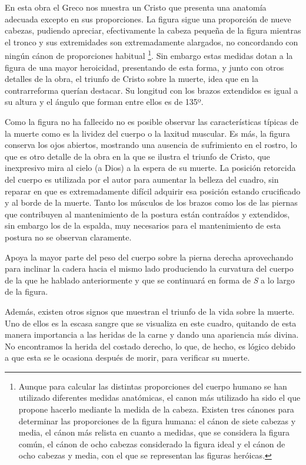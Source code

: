 En esta obra el Greco nos muestra un Cristo que presenta una anatomía adecuada excepto en sus proporciones. La figura sigue una proporción de nueve cabezas, pudiendo apreciar, efectivamente la cabeza pequeña de la figura mientras el tronco y sus extremidades son extremadamente alargados, no concordando con ningún cánon de proporciones habitual \footnote{Aunque para calcular las distintas proporciones del cuerpo humano se han utilizado diferentes medidas anatómicas, el canon más utilizado ha sido el que propone hacerlo mediante la medida de la cabeza. Existen tres cánones para determinar las proporciones de la figura humana: el cánon de siete cabezas y media, el cánon más relista en cuanto a medidas, que se considera la figura común, el cánon de ocho cabezas considerado la figura ideal y el cánon de ocho cabezas y media, con el que se representan las figuras heróicas.}. Sin embargo estas medidas dotan a la figura de una mayor heroicidad, presentando de esta forma, y junto con otros detalles de la obra, el triunfo de Cristo sobre la muerte, idea que en la contrarreforma querían destacar. Su longitud con los brazos extendidos es igual a su altura y el ángulo que forman entre ellos es de 135º.

Como la figura no ha fallecido no es posible observar las características típicas de la muerte como es la lividez del cuerpo o la laxitud muscular. Es más, la figura conserva los ojos abiertos, mostrando una ausencia de sufrimiento en el rostro, lo que es otro detalle de la obra en la que se ilustra el triunfo de Cristo, que inexpresivo mira al cielo (a Dios) a la espera de su muerte. La posición retorcida del cuerpo es utilizada por el autor para aumentar la belleza del cuadro, sin reparar en que es extremadamente difícil adquirir esa posición estando crucificado y al borde de la muerte. Tanto los músculos de los brazos como los de las piernas que contribuyen al mantenimiento de la postura están contraídos y extendidos, sin embargo los de la espalda, muy necesarios para el mantenimiento de esta postura no se observan claramente.

Apoya la mayor parte del peso del cuerpo sobre la pierna derecha aprovechando para inclinar la cadera hacia el mismo lado produciendo la curvatura del cuerpo de la que he hablado anteriormente y que se continuará en forma de \textit{S} a lo largo de la figura.

Además, existen otros signos que muestran el triunfo de la vida sobre la muerte. Uno de ellos es la escasa sangre que se visualiza en este cuadro, quitando de esta manera importancia a las heridas de la carne y dando una apariencia más divina. No encontramos la herida del costado derecho, lo que, de hecho, es lógico debido a que esta se le ocasiona después de morir, para verificar su muerte.

